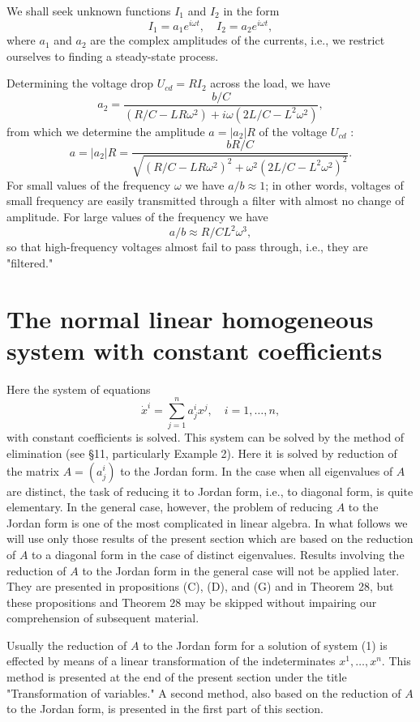 \documentclass[10pt,a5paper]{book}
\theoremstyle{plain}
\theoremstyle{definition}
\theoremstyle{remark}
\begin{document}
We shall seek unknown functions $I_{1}$ and $I_{2}$ in the form
\[
I_{1}=a_{1} e^{i \omega t}, \quad I_{2}=a_{2} e^{i \omega t},
\]
where $a_{1}$ and $a_{2}$ are the complex amplitudes of the currents, i.e., we restrict ourselves to finding a steady-state process.

Determining the voltage drop $U_{c d}=R I_{2}$ across the load, we have
\[
a_{2}=\frac{b / C}{\left(R / C-L R \omega^{2}\right)+i \omega\left(2 L / C-L^{2} \omega^{2}\right)},
\]
from which we determine the amplitude $a=\left|a_{2}\right| R$ of the voltage $U_{c d}$ :
\[
a=\left|a_{2}\right| R=\frac{b R / C}{\sqrt{\left(R / C-L R \omega^{2}\right)^{2}+\omega^{2}\left(2 L / C-L^{2} \omega^{2}\right)^{2}}} .
\]
For small values of the frequency $\omega$ we have $a / b \approx 1$; in other words, voltages of small frequency are easily transmitted through a filter with almost no change of amplitude. For large values of the frequency we have
\[
a / b \approx R / C L^{2} \omega^{3},
\]
so that high-frequency voltages almost fail to pass through, i.e., they are "filtered."
\section{The normal linear homogeneous system with constant coefficients}
Here the system of equations
\begin{equation*}
\dot{x}^{i}=\sum_{j=1}^{n} a_{j}^{i} x^{j}, \quad i=1, \ldots, n, \tag{1}
\end{equation*}
with constant coefficients is solved. This system can be solved by the method of elimination (see §11, particularly Example 2). Here it is solved
by reduction of the matrix $A=\left(a_{j}^{i}\right)$ to the Jordan form. In the case when all eigenvalues of $A$ are distinct, the task of reducing it to Jordan form, i.e., to diagonal form, is quite elementary. In the general case, however, the problem of reducing $A$ to the Jordan form is one of the most complicated in linear algebra. In what follows we will use only those results of the present section which are based on the reduction of $A$ to a diagonal form in the case of distinct eigenvalues. Results involving the reduction of $A$ to the Jordan form in the general case will not be applied later. They are presented in propositions (C), (D), and (G) and in Theorem 28, but these propositions and Theorem 28 may be skipped without impairing our comprehension of subsequent material.

Usually the reduction of $A$ to the Jordan form for a solution of system (1) is effected by means of a linear transformation of the indeterminates $x^{1}, \ldots, x^{n}$. This method is presented at the end of the present section under the title "Transformation of variables." A second method, also based on the reduction of $A$ to the Jordan form, is presented in the first part of this section.
\end{document}
